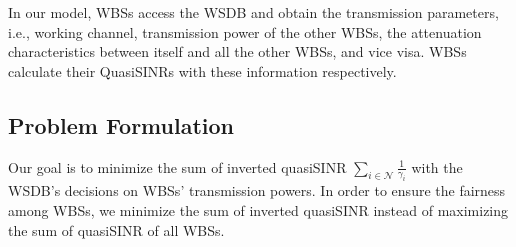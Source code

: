 \documentclass[times]{ettauth}
\newcommand{\ie}{i.e., }
\theoremstyle{mytheoremstyle}
\theoremstyle{mytheoremstyle}
\theoremstyle{mytheoremstyle}
\begin{document}
In our model, WBSs access the WSDB and obtain the transmission parameters, \ie working channel, transmission power of the other WBSs, the attenuation characteristics between itself and all the other WBSs, and vice visa. 
WBSs calculate their QuasiSINRs with these information respectively.












\subsection{Problem Formulation}
\label{problemProposed}
Our goal is to minimize the sum of inverted quasiSINR $\sum_{i\in \mathcal{N}}\frac{1}{\gamma_{i}}$ with the WSDB's decisions on WBSs' transmission powers.
In order to ensure the fairness among WBSs,  we minimize the sum of inverted quasiSINR instead of maximizing the sum of quasiSINR of all WBSs.
\end{document}
